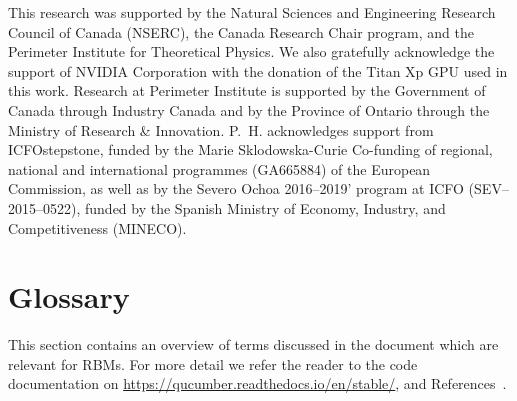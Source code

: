 \documentclass[submission, Phys, hidelnks]{SciPost}
\begin{document}
This research was supported by the Natural Sciences and Engineering
Research Council of Canada (NSERC), the
Canada Research Chair program, and the Perimeter Institute
for Theoretical Physics. We also gratefully
acknowledge the support of NVIDIA Corporation with
the donation of the Titan Xp GPU used in this work.
Research at Perimeter Institute is supported by the Government
of Canada through Industry Canada and by the
Province of Ontario through the Ministry of Research \&
Innovation. P.~H. acknowledges support from ICFOstepstone,
funded by the Marie Sklodowska-Curie Co-funding of regional,
national and international programmes (GA665884) of the European
Commission, as well as by the Severo Ochoa 2016{--}2019' program at
ICFO (SEV{--}2015{--}0522), funded by the Spanish Ministry of Economy,
 Industry, and Competitiveness (MINECO).


\appendix

\section{Glossary}\label{Glossary}
This section contains an overview of terms discussed in the document which are
relevant for RBMs. For more detail we refer the reader to the code documentation
on \url{https://qucumber.readthedocs.io/en/stable/}, and
References~\cite{hinton_training_2002, hinton2012practical}.
\end{document}
